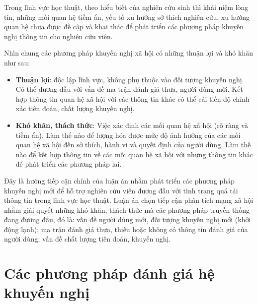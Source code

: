 Trong lĩnh vực học thuật, theo hiểu biết của nghiên cứu sinh thì khái niệm lòng tin, những mối quan hệ tiềm ẩn, yếu tố xu hướng sở thích nghiên cứu, xu hướng quan hệ chưa được đề cập và khai thác để phát triển các phương pháp khuyến nghị thông tin cho nghiên cứu viên. 

Nhìn chung các phương pháp khuyến nghị xã hội có những thuận lợi và khó khăn như sau:

\begin{itemize}
	\item \textbf{Thuận lợi}: độc lập lĩnh vực, không phụ thuộc vào đối tượng khuyến nghị. Có thể đương đầu với vấn đề ma trận đánh giá thưa, người dùng mới. Kết hợp thông tin quan hệ xã hội với các thông tin khác có thể cải tiến độ chính xác tiên đoán, chất lượng khuyến nghị.
\end{itemize}
\begin{itemize}
	\item \textbf{Khó khăn, thách thức}: Việc xác định các mối quan hệ xã hội (rõ ràng và tiềm ẩn). Làm thế nào để lượng hóa được mức độ ảnh hưởng của các mối quan hệ xã hội đến sở thích, hành vi và quyết định của người dùng. Làm thế nào để kết hợp thông tin về các mối quan hệ xã hội với những thông tin khác để phát triển các phương pháp lai.
\end{itemize}

Đây là hướng tiếp cận chính của luận án nhằm phát triển các phương pháp khuyến nghị mới để hỗ trợ nghiên cứu viên đương đầu với tình trạng quá tải thông tin trong lĩnh vực học thuật. Luận án chọn tiếp cận phân tích mạng xã hội nhằm giải quyết những khó khăn, thách thức mà các phương pháp truyền thống đang đương đầu, đó là: vấn đề người dùng mới, đối tượng khuyến nghị mới (khởi động lạnh); ma trận đánh giá thưa, thiếu hoặc không có thông tin đánh giá của người dùng; vấn đề chất lượng tiên đoán, khuyến nghị. 

\section{Các phương pháp đánh giá hệ khuyến nghị}
